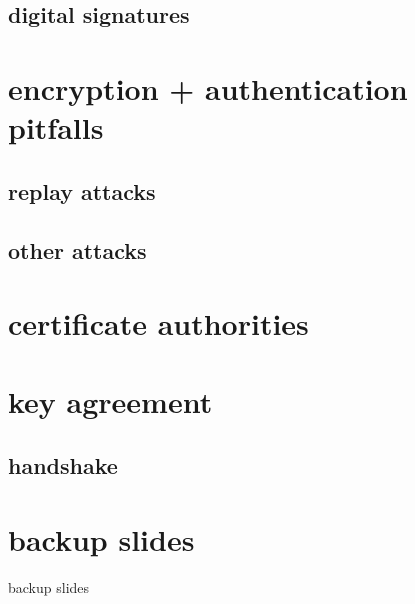 

\subsection{digital signatures}



\section{encryption + authentication pitfalls}



\subsection{replay attacks}



\subsection{other attacks}



\section{certificate authorities}



\section{key agreement}




\subsection{handshake}



\section{backup slides}
\begin{frame}{backup slides}
\end{frame}


